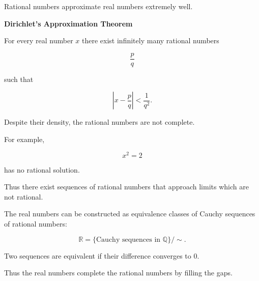 \medskip


\begin{tcolorbox}[colback=gray!6, colframe=gray!40, arc=2pt,
title={Rational Approximation}]

Rational numbers approximate real numbers extremely well.

\textbf{Dirichlet's Approximation Theorem}

For every real number $x$ there exist infinitely many rational numbers

\[
\frac{p}{q}
\]

such that

\[
\left|x-\frac{p}{q}\right|
<
\frac{1}{q^{2}}.
\]

\end{tcolorbox}

\medskip


\begin{tcolorbox}[colback=gray!6, colframe=gray!40, arc=2pt,
title={Gaps in $\mathbb{Q}$}]

Despite their density, the rational numbers are not complete.

For example,

\[
x^{2}=2
\]

has no rational solution.

Thus there exist sequences of rational numbers that approach
limits which are not rational.

\end{tcolorbox}

\medskip


\begin{tcolorbox}[colback=gray!6, colframe=gray!40, arc=2pt,
title={Completion to the Real Numbers}]

The real numbers can be constructed as equivalence classes
of Cauchy sequences of rational numbers:

\[
\mathbb{R}
=
\{\text{Cauchy sequences in }\mathbb{Q}\}/\sim.
\]

Two sequences are equivalent if their difference converges to $0$.

Thus the real numbers complete the rational numbers by filling
the gaps.

\end{tcolorbox}

